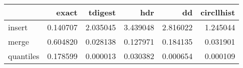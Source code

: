 \begin{tabular}{lrrrrr}
\toprule
{} &     exact &   tdigest &       hdr &        dd &  circllhist \\
\midrule
insert    &  0.140707 &  2.035045 &  3.439048 &  2.816022 &    1.245044 \\
merge     &  0.604820 &  0.028138 &  0.127971 &  0.184135 &    0.031901 \\
quantiles &  0.178599 &  0.000013 &  0.030382 &  0.000654 &    0.000109 \\
\bottomrule
\end{tabular}
